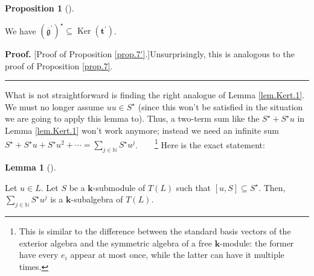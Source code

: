 \documentclass[numbers=enddot,12pt,final,onecolumn,notitlepage]{scrartcl}%
\theoremstyle{definition}
\newtheorem{lem}[theo]{Lemma}
\newenvironment{lemma}[1][]
{\begin{lem}[#1]\begin{leftbar}}
{\end{leftbar}\end{lem}}
\newtheorem{prop}[theo]{Proposition}
\newenvironment{proposition}[1][]
{\begin{prop}[#1]\begin{leftbar}}
{\end{leftbar}\end{prop}}
\newenvironment{proof}[1][Proof]{\noindent\textbf{#1.} }{\ \rule{0.5em}{0.5em}}
\let\sumnonlimits\sum
\renewcommand{\sum}{\sumnonlimits\limits}
\begin{document}
\begin{proposition}
\label{prop.7'}We have $\left(  \overline{\mathfrak{g}}^{\prime}\right)
^{\star}\subseteq\operatorname*{Ker}\left(  \mathbf{t}^{\prime}\right)  $.
\end{proposition}

\begin{proof}
[Proof of Proposition \ref{prop.7'}.]Unsurprisingly, this is analogous to the
proof of Proposition \ref{prop.7}.
\end{proof}

What is not straightforward is finding the right analogue of Lemma
\ref{lem.Kert.1}. We must no longer assume $uu\in S^{\star}$ (since this won't
be satisfied in the situation we are going to apply this lemma to). Thus, a
two-term sum like the $S^{\star}+S^{\star}u$ in Lemma \ref{lem.Kert.1} won't
work anymore; instead we need an infinite sum $S^{\star}+S^{\star}u+S^{\star
}u^{2}+\cdots=\sum_{j\in\mathbb{N}}S^{\star}u^{j}$.\ \ \ \ \footnote{This is
similar to the difference between the standard basis vectors of the exterior
algebra and the symmetric algebra of a free $\mathbf{k}$-module: the former
have every $e_{i}$ appear at most once, while the latter can have it multiple
times.} Here is the exact statement:

\begin{lemma}
\label{lem.Kert'.1}Let $u\in L$. Let $S$ be a $\mathbf{k}$-submodule of
$T\left(  L\right)  $ such that $\left[  u,S\right]  \subseteq S^{\star}$.
Then, $\sum_{j\in\mathbb{N}}S^{\star}u^{j}$ is a $\mathbf{k}$-subalgebra of
$T\left(  L\right)  $.
\end{lemma}
\end{document}
